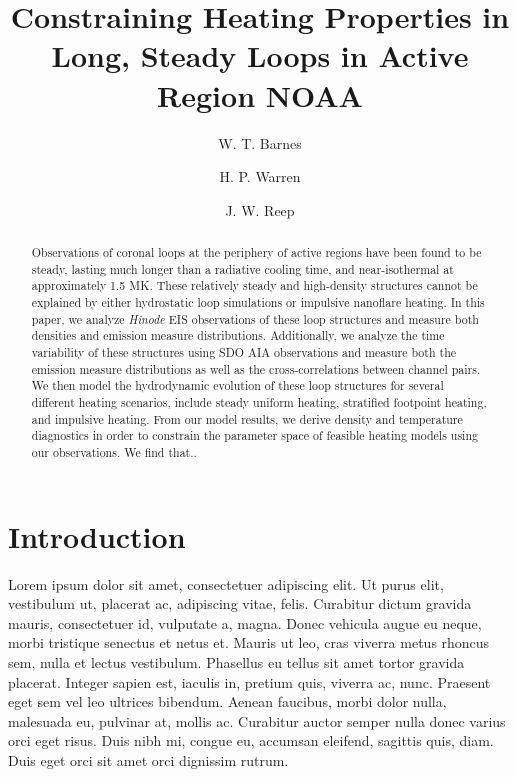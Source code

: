 \documentclass[twocolumn]{aastex631}
\begin{document}
\title{Constraining Heating Properties in Long, Steady Loops in Active Region NOAA }

\author[0000-0001-9642-6089]{W. T. Barnes}
\author[0000-0001-6102-6851]{H. P. Warren}
\author[0000-0003-4739-1152]{J. W. Reep}

\begin{abstract}
Observations of coronal loops at the periphery of active regions have been found to be steady, lasting much longer than a radiative cooling time, and near-isothermal at approximately 1.5 MK.
These relatively steady and high-density structures cannot be explained by either hydrostatic loop simulations or impulsive nanoflare heating.
In this paper, we analyze \textit{Hinode} EIS observations of these loop structures and measure both densities and emission measure distributions.
Additionally, we analyze the time variability of these structures using SDO AIA observations and measure both the emission measure distributions as well as the cross-correlations between channel pairs.
We then model the hydrodynamic evolution of these loop structures for several different heating scenarios, include steady uniform heating, stratified footpoint heating, and impulsive heating.
From our model results, we derive density and temperature diagnostics in order to constrain the parameter space of feasible heating models using our observations.
We find that..
\end{abstract}

\section{Introduction}
\label{sec:intro}

Lorem ipsum dolor sit amet, consectetuer adipiscing elit.
Ut purus elit, vestibulum ut, placerat ac, adipiscing vitae, felis.
Curabitur dictum gravida mauris, consectetuer id, vulputate a, magna.
Donec vehicula augue eu neque, morbi tristique senectus et netus et.
Mauris ut leo, cras viverra metus rhoncus sem, nulla et lectus vestibulum.
Phasellus eu tellus sit amet tortor gravida placerat.
Integer sapien est, iaculis in, pretium quis, viverra ac, nunc.
Praesent eget sem vel leo ultrices bibendum.
Aenean faucibus, morbi dolor nulla, malesuada eu, pulvinar at, mollis ac.
Curabitur auctor semper nulla donec varius orci eget risus.
Duis nibh mi, congue eu, accumsan eleifend, sagittis quis, diam.
Duis eget orci sit amet orci dignissim rutrum.
\end{document}
